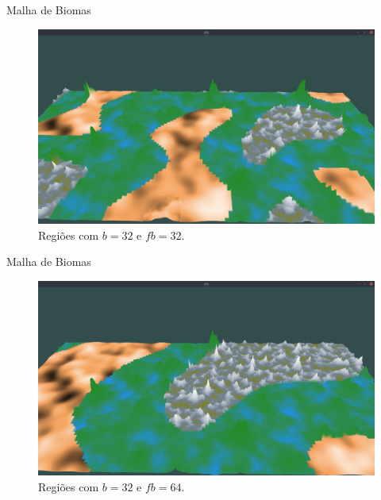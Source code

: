 \begin{frame}{Malha de Biomas}
    \begin{figure}[H]
        \centering
        \includegraphics[width=.9\textwidth]{img/re2bfb/fb/32b32.png}
        \caption{Regiões com $b = 32$ e $fb = 32$.}
        \label{fig:img_re2bfb_fb_32b32}
    \end{figure}
    
    
\end{frame}

\begin{frame}{Malha de Biomas}
    \begin{figure}[H]
        \centering
        \includegraphics[width=.9\textwidth]{img/re2bfb/fb/64b32.png}
        \caption{Regiões com $b = 32$ e $fb = 64$.}
        \label{fig:img_re2bfb_fb_64b32}
    \end{figure}
    
    
\end{frame}